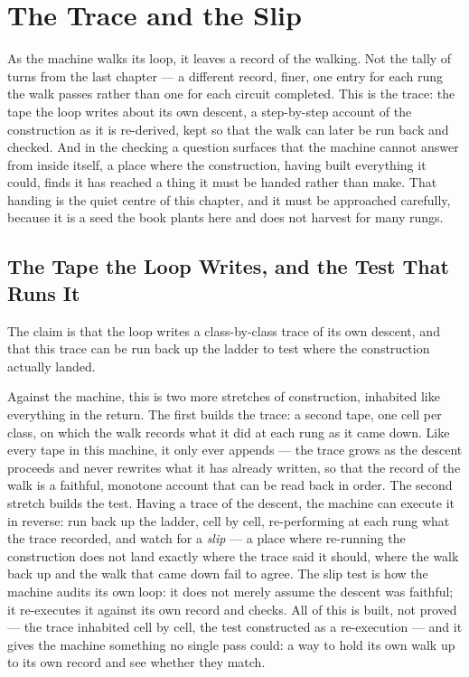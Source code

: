 \chapter{The Trace and the Slip}

As the machine walks its loop, it leaves a record of the walking. Not the tally of turns from the last chapter ---
a different record, finer, one entry for each rung the walk passes rather than one for each circuit completed.
This is the trace: the tape the loop writes about its own descent, a step-by-step account of the construction as
it is re-derived, kept so that the walk can later be run back and checked. And in the checking a question surfaces
that the machine cannot answer from inside itself, a place where the construction, having built everything it
could, finds it has reached a thing it must be handed rather than make. That handing is the quiet centre of this
chapter, and it must be approached carefully, because it is a seed the book plants here and does not harvest for
many rungs.

\section{The Tape the Loop Writes, and the Test That Runs It}

The claim is that the loop writes a class-by-class trace of its own descent, and that this trace can be run back
up the ladder to test where the construction actually landed.

Against the machine, this is two more stretches of construction, inhabited like everything in the return. The
first builds the trace: a second tape, one cell per class, on which the walk records what it did at each rung as
it came down. Like every tape in this machine, it only ever appends --- the trace grows as the descent proceeds
and never rewrites what it has already written, so that the record of the walk is a faithful, monotone account
that can be read back in order. The second stretch builds the test. Having a trace of the descent, the machine can
execute it in reverse: run back up the ladder, cell by cell, re-performing at each rung what the trace recorded,
and watch for a \emph{slip} --- a place where re-running the construction does not land exactly where the trace
said it should, where the walk back up and the walk that came down fail to agree. The slip test is how the machine
audits its own loop: it does not merely assume the descent was faithful; it re-executes it against its own record
and checks. All of this is built, not proved --- the trace inhabited cell by cell, the test constructed as a
re-execution --- and it gives the machine something no single pass could: a way to hold its own walk up to its own
record and see whether they match.

